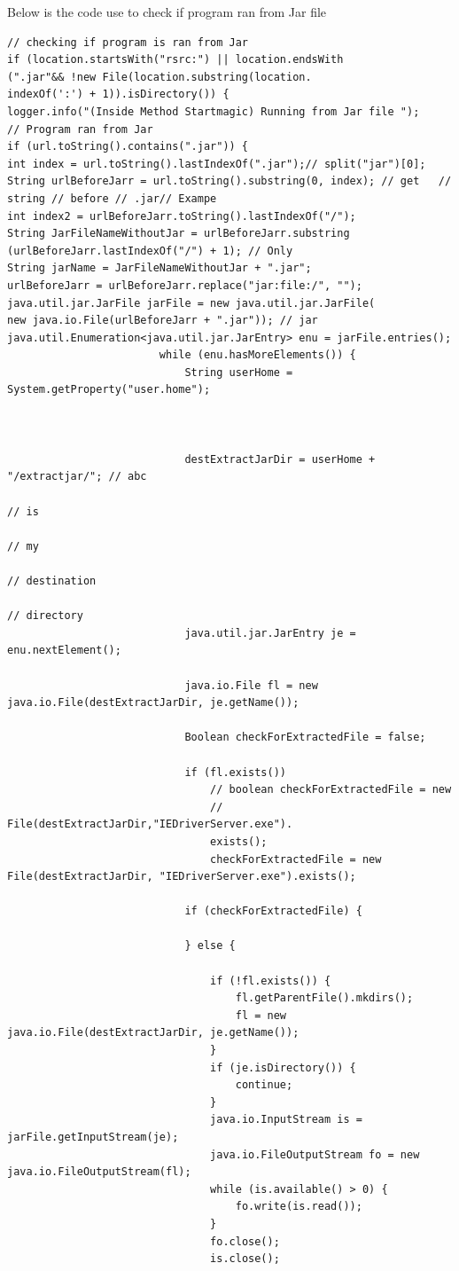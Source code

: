 \documentclass[12pt]{report}
\begin{document}
Below is the code use to check if program ran from Jar file
\begin{verbatim}
// checking if program is ran from Jar
if (location.startsWith("rsrc:") || location.endsWith
(".jar"&& !new File(location.substring(location.
indexOf(':') + 1)).isDirectory()) {
logger.info("(Inside Method Startmagic) Running from Jar file ");
// Program ran from Jar
if (url.toString().contains(".jar")) {
int index = url.toString().lastIndexOf(".jar");// split("jar")[0];
String urlBeforeJarr = url.toString().substring(0, index); // get	// string // before	// .jar// Exampe
int index2 = urlBeforeJarr.toString().lastIndexOf("/");
String JarFileNameWithoutJar = urlBeforeJarr.substring
(urlBeforeJarr.lastIndexOf("/") + 1); // Only	
String jarName = JarFileNameWithoutJar + ".jar";
urlBeforeJarr = urlBeforeJarr.replace("jar:file:/", "");
java.util.jar.JarFile jarFile = new java.util.jar.JarFile(
new java.io.File(urlBeforeJarr + ".jar")); // jar
java.util.Enumeration<java.util.jar.JarEntry> enu = jarFile.entries();
						while (enu.hasMoreElements()) {
							String userHome = System.getProperty("user.home");

				

							destExtractJarDir = userHome + "/extractjar/"; // abc
																			// is
																			// my
																			// destination
																			// directory
							java.util.jar.JarEntry je = enu.nextElement();

							java.io.File fl = new java.io.File(destExtractJarDir, je.getName());

							Boolean checkForExtractedFile = false;

							if (fl.exists())
								// boolean checkForExtractedFile = new
								// File(destExtractJarDir,"IEDriverServer.exe").
								exists();
								checkForExtractedFile = new File(destExtractJarDir, "IEDriverServer.exe").exists();

							if (checkForExtractedFile) {
								
							} else {
								
								if (!fl.exists()) {
									fl.getParentFile().mkdirs();
									fl = new java.io.File(destExtractJarDir, je.getName());
								}
								if (je.isDirectory()) {
									continue;
								}
								java.io.InputStream is = jarFile.getInputStream(je);
								java.io.FileOutputStream fo = new java.io.FileOutputStream(fl);
								while (is.available() > 0) {
									fo.write(is.read());
								}
								fo.close();
								is.close();


\end{verbatim}
\end{document}
